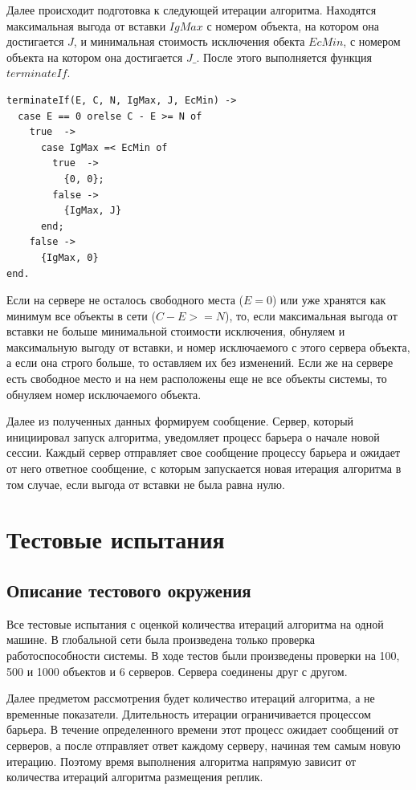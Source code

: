 			Далее происходит подготовка к следующей итерации алгоритма. Находятся максимальная выгода от вставки $IgMax$ с номером объекта, на котором она достигается $J$, и минимальная стоимость 
			исключения обекта $EcMin$, с номером объекта на котором она достигается $J\_$. После этого выполняется функция $terminateIf$.
			\begin{lstlisting}
terminateIf(E, C, N, IgMax, J, EcMin) ->
  case E == 0 orelse C - E >= N of
    true  -> 
      case IgMax =< EcMin of
        true  -> 
          {0, 0};
        false -> 
          {IgMax, J}
      end;
    false -> 
      {IgMax, 0}
end.	
			\end{lstlisting}
			Если на сервере не осталось свободного места ($E = 0$) или уже хранятся как минимум все объекты в сети ($C - E >= N$), то, если максимальная выгода от вставки не больше минимальной 
			стоимости исключения, обнуляем и максимальную выгоду от вставки, и номер исключаемого с этого сервера объекта, а если она строго больше, то оставляем их без изменений.
			Если же на сервере есть свободное место и на нем расположены еще не все объекты системы, то обнуляем номер исключаемого объекта. 
			
			Далее из полученных данных формируем сообщение. Сервер, который инициировал запуск алгоритма, уведомляет процесс барьера о начале новой сессии. Каждый сервер отправляет свое
			сообщение процессу барьера  и ожидает от него ответное сообщение, с которым запускается новая итерация алгоритма в том случае, если выгода от вставки не была равна нулю.


			
\chapter{Тестовые испытания}
	\section{Описание тестового окружения}
		Все тестовые испытания с оценкой количества итераций алгоритма на одной машине. В глобальной сети была произведена только проверка работоспособности системы. В ходе тестов были 
		произведены проверки на 100, 500 и 1000 объектов и 6 серверов. Сервера соединены друг с другом. 

		Далее предметом рассмотрения будет количество итераций алгоритма, а не временные показатели. Длительность итерации ограничивается процессом барьера. В течение определенного времени
		этот процесс ожидает сообщений от серверов, а после отправляет ответ каждому серверу, начиная тем самым новую итерацию. Поэтому время выполнения алгоритма напрямую зависит от 
		количества итераций алгоритма размещения реплик.
		
